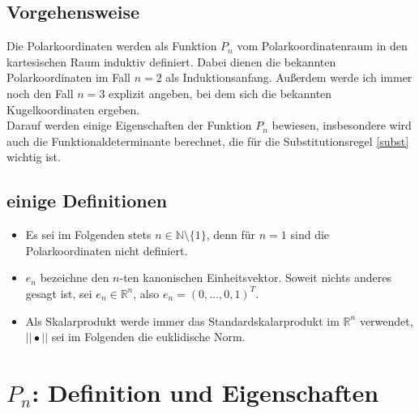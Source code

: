 \documentclass[a4paper,11pt]{report}
\theoremstyle{definition}
\newcommand{\R}{{\ensuremath{\mathbb{R}}}}
\newcommand{\N}{{\ensuremath{\mathbb{N}}}}
\begin{document}
\section{Vorgehensweise}
Die Polarkoordinaten werden als Funktion $P_n$ vom \glqq Polarkoordinatenraum\grqq{} in den kartesischen Raum induktiv definiert. Dabei dienen die bekannten Polarkoordinaten im Fall $n=2$ als Induktionsanfang. Außerdem werde ich immer noch den Fall $n=3$ explizit angeben, bei dem sich die bekannten Kugelkoordinaten ergeben.\\
Darauf werden einige Eigenschaften der Funktion $P_n$ bewiesen, insbesondere wird auch die Funktionaldeterminante berechnet, die für die Substitutionsregel \eqref{subst}
wichtig ist.
\section{einige Definitionen}
\begin{itemize}
\item Es sei im Folgenden stets $n\in\N\setminus\{1\}$, denn für $n=1$ sind die Polarkoordinaten nicht definiert.
\item $e_n$ bezeichne den $n$-ten kanonischen Einheitsvektor. Soweit nichts anderes gesagt ist, sei $e_n\in\R^n$, also $e_n=(0,\ldots,0,1)^T$.
\item Als Skalarprodukt werde immer das Standardskalarprodukt im $\R^n$ verwendet, $||\bullet||$ sei im Folgenden die euklidische Norm.
\end{itemize}
\chapter{$P_n$: Definition und Eigenschaften}
\end{document}
